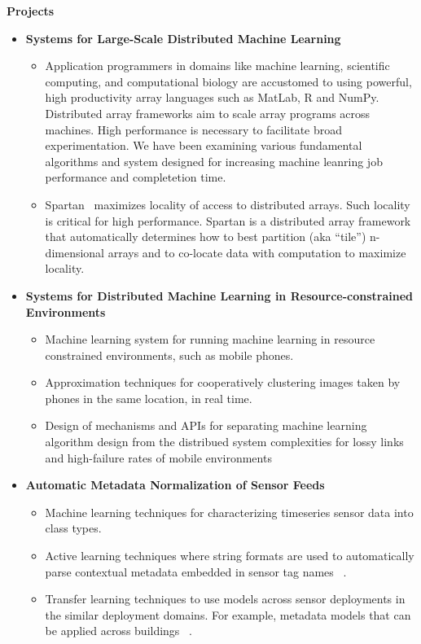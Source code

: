 \documentclass[letterpaper,11pt]{article}
\newcommand{\resitem}[1]{\item #1 \vspace{-2pt}}
\newcommand{\resheading}[1]{{\large \colorbox{mygrey}{\begin{minipage}{\textwidth}{\textbf{#1 \vphantom{p\^{E}}}}\end{minipage}}}}
\begin{document}
\resheading{Projects}
\begin{itemize}
    \item {\textbf{Systems for Large-Scale Distributed Machine Learning}}
            \begin{itemize}
                \resitem{Application programmers in domains like machine learning, scientific computing, and computational biology are accustomed to using powerful, high productivity array languages such as MatLab, R and NumPy. Distributed array frameworks aim to scale array programs across machines. High performance is necessary to facilitate broad experimentation.  We have been examining various fundamental algorithms and system designed for increasing machine leanring job performance and completetion time.}
                \resitem{Spartan~\cite{spartan} maximizes locality of access to distributed arrays. Such locality is critical for high performance.  Spartan is a distributed array framework that automatically determines how to best partition (aka “tile”) n-dimensional arrays and to co-locate data with computation to maximize locality.}
            \end{itemize}

    \item {\textbf{Systems for Distributed Machine Learning in Resource-constrained Environments}}
        \begin{itemize}
            \resitem{Machine learning system for running machine learning in resource constrained environments, such as mobile phones.}
            \resitem{Approximation techniques for cooperatively clustering images taken by phones in the same location, in real time.}
            \resitem{Design of mechanisms and APIs for separating machine learning algorithm design from the distribued system complexities for lossy links and high-failure rates of mobile environments} 
        \end{itemize}

    \item {\textbf{Automatic Metadata Normalization of Sensor Feeds}}
        \begin{itemize}
            \resitem{Machine learning techniques for characterizing timeseries sensor data into class types.}
            \resitem{Active learning techniques where string formats are used to automatically parse contextual metadata embedded in sensor tag names~\cite{Arka_buildsys2015}}.
            \resitem{Transfer learning techniques to use models across sensor deployments in the similar deployment domains.  For example, metadata models that can be applied across buildings~\cite{Fontugne:2013:SBS:2461381.2461399,Hong:2013:TAS:2528282.2528302,Dezhi_buildsys2015}}.
        \end{itemize}
\end{itemize}
\end{document}
